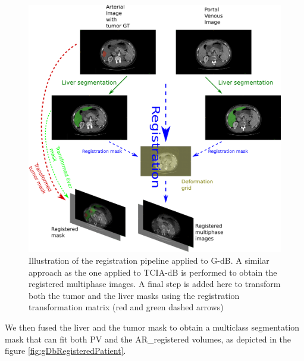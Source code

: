\documentclass[]{article}
\newcommand{\lmttfont}[1]{{\fontfamily{lmtt}\selectfont #1}}
\begin{document}
\begin{figure}[th!]
\centering
\includegraphics[width=0.7\linewidth]{images/GDB/GDB_registration_pipeline_vertical}
\caption{Illustration of the registration pipeline applied to \lmttfont{G-dB}. A similar approach as the one applied to \lmttfont{TCIA-dB} is performed to obtain the registered multiphase images. A final step is added here to transform both the tumor and the liver masks using the registration transformation matrix (red and green dashed arrows)}
\label{fig:GDB_registration_pipeline_vertical}
\end{figure}

We then fused the liver and the tumor mask to obtain a multiclass
segmentation mask that can fit both PV and the AR\_registered volumes, as depicted in the figure \ref{fig:gDbRegisteredPatient}.
\end{document}
